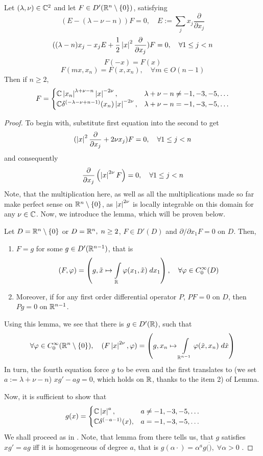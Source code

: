 \documentclass[10pt]{article} %
\begin{document}
\begin{myprop}
	Let $(\lambda,\nu)\in\mathbb{C}^2$ and let $F\in D'(\mathbb{R}^n\setminus\left\{0\right\})$, satisfying
	\[(E-(\lambda-\nu-n))F=0,\quad E:=\sum_jx_j\frac{\partial}{\partial x_j}\]
	\[((\lambda-n)x_j-x_jE+\frac{1}{2}\left|x\right|^2\frac{\partial}{\partial x_j})F=0,\quad\forall1\leq j<n\]
	\[F(-x)=F(x)\]
	\[F(mx,x_n)=F(x,x_n),\quad \forall m\in O(n-1)\]
	Then if $n\geq2$,
	\[F=\begin{cases}
		\mathbb{C}\left|x_n\right|^{\lambda+\nu-n}\left|x\right|^{-2\nu},&\lambda+\nu-n\neq-1,-3,-5,\hdots\\
		\mathbb{C}\delta^{\left(-\lambda-\nu+n-1\right)}(x_n)\left|x\right|^{-2\nu},&\lambda+\nu-n=-1,-3,-5,\hdots
	\end{cases}\]
	\end{myprop}
	\begin{proof}
		To begin with, substitute first equation into the second to get
		\[(\left|x\right|^2\frac{\partial}{\partial x_j}+2\nu x_j)F=0,\quad\forall1\leq j<n\]
		and consequently
		\[\frac{\partial}{\partial x_j}\left(\left|x\right|^{2\nu} F\right)=0,\quad\forall1\leq j<n\]
		Note, that the multiplication here, as well as all the multiplications made so far make perfect sense on $\mathbb{R}^n\setminus
		\left\{0\right\}$, as $\left|x\right|^{2\nu}$ is locally integrable on this domain for any $\nu\in\mathbb{C}$.
		Now, we introduce the lemma, which will be proven below.
		\begin{mylem}\label{Lemma}
			Let $D=\mathbb{R}^n\setminus\left\{0\right\}$ or $D=\mathbb{R}^n,\;n\geq2$,
			$F\in D'(D)$ and $\partial/\partial x_1F=0$ on $D$. Then,
			\begin{enumerate}
				\item $F=g$ for some $g\in D'(\mathbb{R}^{n-1})$, that is
			\[(F,\phi)=\mybra{g,\tilde{x}\mapsto\int_\R\phi(x_1,\tilde{x})\;dx_1},\quad\forall \phi\in C^\infty_0(D)\]
				\item Moreover, if for any first order differential operator $P$, $PF=0$ on $D$, then $Pg=0$ on $\mathbb{R}^{n-1}$.
			\end{enumerate}
		\end{mylem}
		Using this lemma, we see that there is $g\in D'(\mathbb{R})$, such that 
		\[\forall \phi\in C^\infty_0(\R^n\setminus\mycbra{0}),\quad (F\myabs{x}^{2\nu}
		,\phi)=\mybra{g,x_n\mapsto\int_{\R^{n-1}}\phi(\tilde{x},x_n)\;d\tilde{x}} \]
		In turn, the fourth equation force $g$ to be even and the first translates to (we set $a:=\lambda+\nu-n$)
		$xg'-ag=0$, which holds on $\mathbb{R}$, thanks to the item 2) of Lemma.

		Now, it is sufficient to show that
		\[g(x)=\begin{cases}
		\mathbb{C}\left|x\right|^a,&a\neq-1,-3,-5,\hdots\\
		\mathbb{C}\delta^{\left(-a-1\right)}(x),&a=-1,-3,-5,\hdots
		\end{cases}\]
		We shall proceed as in \cite[Sec 3.11]{gelfand}. Note, that lemma from there tells us, that
		$g$ satisfies $xg'=ag$ iff it is homogeneous of degree $a$, that is $g(\alpha\cdot)=\alpha^ag(\dot),\;\forall\alpha>0$
		.


\end{proof}
\end{document}
